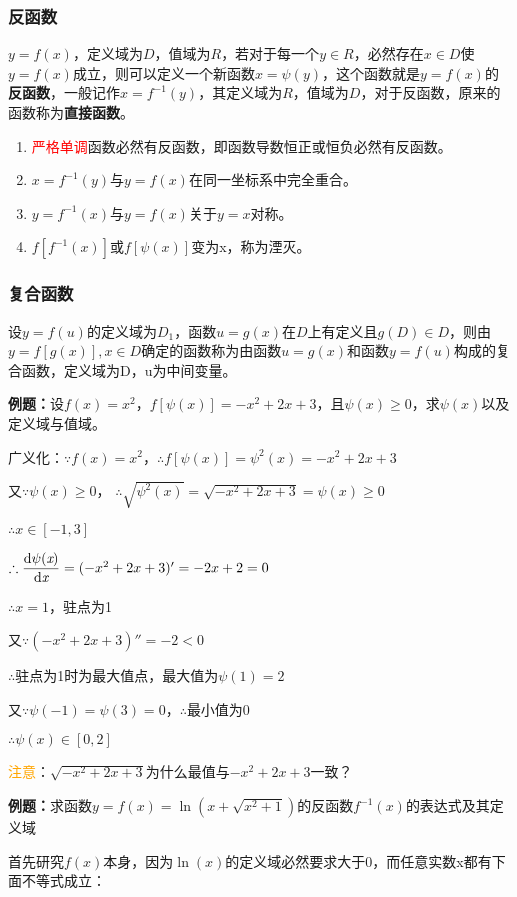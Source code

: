 \documentclass[UTF8, 12pt]{ctexart}
\begin{document}
\subsubsection{反函数}
$y=f(x)$，定义域为$D$，值域为$R$，若对于每一个$y\in R$，必然存在$x\in D$使$y=f(x)$成立，则可以定义一个新函数$x=\psi(y)$，这个函数就是$y=f(x)$的\textbf{反函数}，一般记作$x=f^{-1}(y)$，其定义域为$R$，值域为$D$，对于反函数，原来的函数称为\textbf{直接函数}。
\begin{enumerate}
    \item \textcolor{red}{严格单调}函数必然有反函数，即函数导数恒正或恒负必然有反函数。
    \item $x=f^{-1}(y)$与$y=f(x)$在同一坐标系中完全重合。
    \item $y=f^{-1}(x)$与$y=f(x)$关于$y=x$对称。
    \item $f[f^{-1}(x)]$或$f[\psi(x)]$变为x，称为湮灭。
\end{enumerate}
\subsubsection{复合函数}
设$y=f(u)$的定义域为$D_1$，函数$u=g(x)$在$D$上有定义且$g(D)\in D$，则由$y=f[g(x)],x\in D$确定的函数称为由函数$u=g(x)$和函数$y=f(u)$构成的复合函数，定义域为D，u为中间变量。

\textbf{例题：}设$f(x)=x^2$，$f[\psi(x)]=-x^2+2x+3$，且$\psi(x)\geqslant 0$，求$\psi(x)$以及定义域与值域。

广义化：$\because f(x)=x^2$，$\therefore f[\psi(x)]=\psi^2(x)=-x^2+2x+3$

又$\because\psi(x)\geqslant 0$， $\therefore\sqrt{\psi^2(x)}=\sqrt{-x^2+2x+3}=\psi(x)\geqslant 0$

$\therefore x\in[-1,3]$

$\therefore\dfrac{\rm{d}\psi(\textit{x})}{\rm{d}\textit{x}}=(-x^2+2x+3)'=-2x+2=0$

$\therefore x=1$，驻点为1

又$\because(-x^2+2x+3)''=-2<0$

$\therefore$驻点为1时为最大值点，最大值为$\psi(1)=2$

又$\because\psi(-1)=\psi(3)=0$，$\therefore$最小值为0

$\therefore\psi(x)\in[0,2]$

\textcolor{orange}{注意}：$\sqrt{-x^2+2x+3}$为什么最值与$-x^2+2x+3$一致？

\textbf{例题：}求函数$y=f(x)=\ln(x+\sqrt{x^2+1})$的反函数$f^{-1}(x)$的表达式及其定义域

首先研究$f(x)$本身，因为$\ln(x)$的定义域必然要求大于0，而任意实数x都有下面不等式成立：
\end{document}
